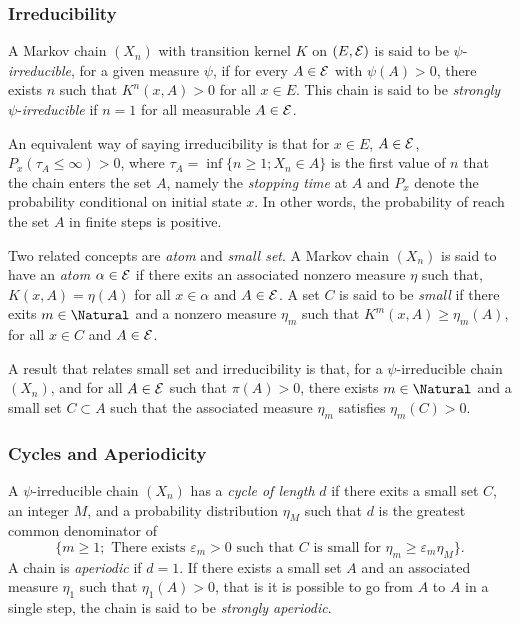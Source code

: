 \subsubsection{Irreducibility}

A Markov chain $(X_n)$ with transition kernel $K$ on $(E,\mathcal{E})$ is said to be
$\psi$-\emph{irreducible}, for a given measure $\psi$, if for every
$A\in\mathcal{E}$ with $\psi(A)>0$, there exists $n$ such that $K^n(x,A)>0$ for all
$x\in E$.  This chain is said to be \emph{strongly} $\psi$-\emph{irreducible}
if $n=1$ for all measurable $A\in\mathcal{E}$.

An equivalent way of saying irreducibility is that for $x\in E$, $A\in\mathcal{E}$,
$P_x(\tau_A\le\infty) > 0$, where $\tau_A = \inf\{n\ge1;X_n\in A\}$ is the
first value of $n$ that the chain enters the set $A$, namely the
\emph{stopping time} at $A$ and $P_x$ denote the probability conditional on
initial state $x$. In other words, the probability of reach the set $A$ in
finite steps is positive.

Two related concepts are \emph{atom} and \emph{small set}. A Markov chain
$(X_n)$ is said to have an \emph{atom} $\alpha\in\mathcal{E}$  if there exits an
associated nonzero measure $\eta$ such that, $K(x,A) = \eta(A)$ for all
$x\in\alpha$ and $A\in\mathcal{E}$. A set $C$ is said to be \emph{small} if there
exits $m\in\Natural$ and a nonzero measure $\eta_m$ such that
$K^m(x,A)\ge\eta_m(A)$, for all $x\in C$ and $A\in\mathcal{E}$.

A result that relates small set and irreducibility is that, for a
$\psi$-irreducible chain $(X_n)$, and for all $A\in\mathcal{E}$ such that
$\pi(A)>0$, there exists $m\in\Natural$ and a small set $C\subset A$ such that
the associated measure $\eta_m$ satisfies $\eta_m(C) > 0$.

\subsubsection{Cycles and Aperiodicity}

A $\psi$-irreducible chain $(X_n)$ has a \emph{cycle of length} $d$ if there
exits a small set $C$, an integer $M$, and a probability distribution $\eta_M$
such that $d$ is the greatest common denominator of
\begin{equation*}
  \{m\ge1;\text{ There exists }\varepsilon_m > 0\text{ such that }C\text{ is
    small for }\eta_m\ge\varepsilon_m\eta_M\}.
\end{equation*}
A chain is \emph{aperiodic} if $d = 1$. If there exists a small set $A$ and an
associated measure $\eta_1$ such that $\eta_1(A) > 0$, that is it is possible
to go from $A$ to $A$ in a single step, the chain is said to be
\emph{strongly aperiodic}.

